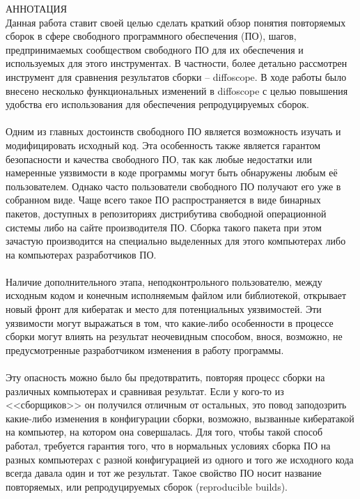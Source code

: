 {\centering
%
\SuperFont\MakeTextUppercase{Аннотация}\\
}
\vspace{32pt}
Данная работа ставит своей целью сделать краткий обзор понятия повторяемых сборок в сфере свободного программного обеспечения (ПО), шагов, предпринимаемых сообществом свободного ПО для их обеспечения и используемых для этого инструментах. В частности, более детально рассмотрен инструмент для сравнения результатов сборки -- diffoscope. В ходе работы было внесено несколько функциональных изменений в diffoscope с целью повышения удобства его использования для обеспечения репродуцируемых сборок.\\\\
Одним из главных достоинств свободного ПО является возможность изучать и модифицировать исходный код. Эта особенность также является гарантом безопасности и качества свободного ПО, так как любые недостатки или намеренные уязвимости в коде программы могут быть обнаружены любым её пользователем. Однако часто пользователи свободного ПО получают его уже в собранном виде. Чаще всего такое ПО распространяется в виде бинарных пакетов, доступных в репозиториях дистрибутива свободной операционной системы либо на сайте производителя ПО. Сборка такого пакета при этом зачастую производится на специально выделенных для этого компьютерах либо на компьютерах разработчиков ПО.\\\\
Наличие дополнительного этапа, неподконтрольного пользователю, между исходным кодом и конечным исполняемым файлом или библиотекой, открывает новый фронт для кибератак и место для потенциальных уязвимостей. Эти уязвимости могут выражаться в том, что какие-либо особенности в процессе сборки могут влиять на результат неочевидным способом, внося, возможно, не предусмотренные разработчиком изменения в работу программы.\\\\
Эту опасность можно было бы предотвратить, повторяя процесс сборки на различных компьютерах и сравнивая результат. Если у кого-то из <<сборщиков>> он получился отличным от остальных, это повод заподозрить какие-либо изменения в конфигурации сборки, возможно, вызванные кибератакой на компьютер, на котором она совершалась. Для того, чтобы такой способ работал, требуется гарантия того, что в нормальных условиях сборка ПО на разных компьютерах с разной конфигурацией из одного и того же исходного кода всегда давала один и тот же результат. Такое свойство ПО носит название повторяемых, или репродуцируемых сборок (reproducible builds).\\\\
